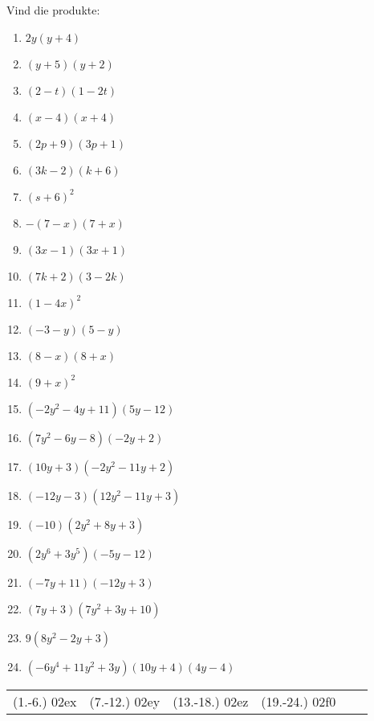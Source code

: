 \begin{exercises}{}
{

Vind die produkte:

\begin{multicols}{2}
\begin{enumerate}[label=\textbf{\arabic*}., itemsep=5pt]
\item $2y(y+4)$ 
\item $(y+5)(y+2) $
\item $(2-t)(1-2t)$
\item $(x-4)(x+4)$
\item $ (2p+9)(3p+1)$
\item $(3k-2)(k+6)$
\item $(s+6)^2$
\item $-(7-x)(7+x)$
\item $(3x-1)(3x+1)$
\item $(7k+2)(3-2k)$
\item $(1-4x)^2$
\item $(-3-y)(5-y)$
\item $(8-x)(8+x)$
\item $(9+x)^2$
\item$(-2{y}^{2}-4y+11)(5y-12)$ 
\item$(7{y}^{2}-6y-8)(-2y+2)$%
\item$(10y+3)(-2{y}^{2}-11y+2)$ 
\item$(-12y-3)(12{y}^{2}-11y+3)$%
\item$(-10)(2{y}^{2}+8y+3)$ 
\item$(2{y}^{6}+3{y}^{5})(-5y-12)$%
\item$(-7y+11)(-12y+3)$%
\item$(7y+3)(7{y}^{2}+3y+10)$%
\item$9(8{y}^{2}-2y+3)$ 
\item \small$(-6{y}^{4}+11{y}^{2}+3y)(10y+4)(4y-4)$ 
\end{enumerate}
\end{multicols}

\par \practiceinfo
\par \begin{tabular}[h]{cccccc}
(1.-6.)	02ex	&
(7.-12.)	02ey	&
(13.-18.)	02ez	&
(19.-24.)	02f0	&

\end{tabular}
}
\end{exercises}





